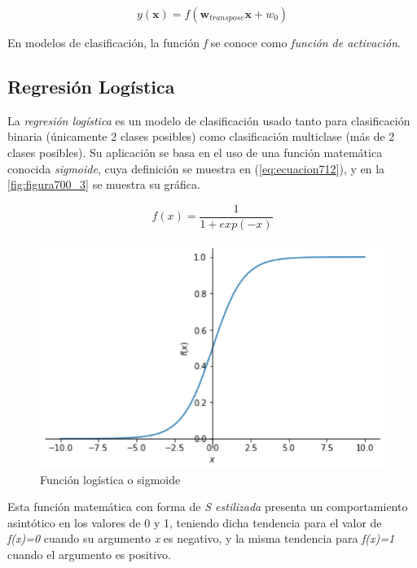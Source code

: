 \begin{equation}
	y(\textbf{x})=f(\textbf{w}_{transpose} \textbf{x} + w_0)
	\label{eq:ecuacion711}
\end{equation}

En modelos de clasificación, la función \textit{f} se conoce como \textit{función de activación}. 

\subsection{Regresión Logística}

La \textit{regresión logística} es un modelo de clasificación usado tanto para clasificación binaria (únicamente 2 clases posibles) como clasificación multiclase (más de 2 clases posibles). Su aplicación se basa en el uso 
de una función matemática conocida \textit{sigmoide}, cuya definición se muestra en (\ref{eq:ecuacion712}), y en la \autoref{fig:figura700_3} se muestra su gráfica.

\begin{equation}
	f(x)=\frac{1}{1+exp(-x)}
	\label{eq:ecuacion712}
\end{equation}

\begin{figure}[h]
	\centering
	\includegraphics[scale=1]{correcionImgss40.png}
	\caption{Función logística o sigmoide}
	\label{fig:figura700_3}
\end{figure}

Esta función matemática con forma de \textit{S estilizada} presenta un comportamiento asintótico en los valores de 0 y 1, teniendo dicha tendencia para el valor de \textit{f(x)=0} cuando su argumento \textit{x} es negativo, 
y la misma tendencia para \textit{f(x)=1} cuando el argumento es positivo.

